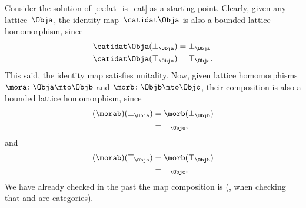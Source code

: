 \begin{solution}
    Consider the solution of \cref{ex:lat_is_cat} as a starting point.
    Clearly, given any lattice~$\Obja$, the identity map~$\catidat\Obja$ is also a bounded lattice homomorphism, since
    \begin{equation}
        \begin{aligned}
            \catidat\Obja(\bot_\Obja) & =\bot_\Obja \\
            \catidat\Obja(\top_\Obja) & =\top_\Obja.
        \end{aligned}
    \end{equation}
    This said, the identity map satisfies unitality.
    Now, given lattice homomorphisms $\mora\colon \Obja \mto \Objb$ and  $\morb\colon \Objb\mto \Objc$, their composition is also a bounded lattice homomorphism, since
    \begin{equation}
        \begin{aligned}
            (\morab)(\bot_\Obja)
             & = \morb(\bot_\Objb) \\
             & = \bot_\Objc,
        \end{aligned}
    \end{equation}
    and
    \begin{equation}
        \begin{aligned}
            (\morab)(\top_\Obja)
             & = \morb(\top_\Objb) \\
             & = \top_\Objc.
        \end{aligned}
    \end{equation}
    We have already checked in the past the map composition is  (\eg, when checking that \Set and \Pos are categories).
\end{solution}

